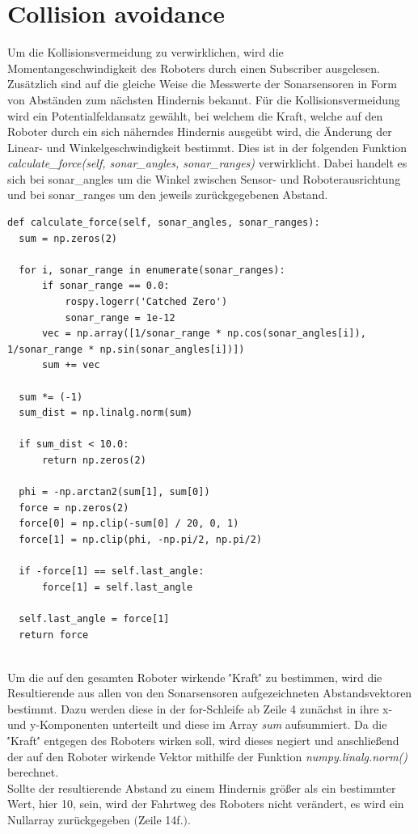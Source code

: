 \documentclass[12pt, a4paper]{report}
\begin{document}
\section{Collision avoidance}
Um die Kollisionsvermeidung zu verwirklichen, wird die Momentangeschwindigkeit des Roboters durch einen Subscriber ausgelesen. Zusätzlich sind auf die gleiche Weise die Messwerte der Sonarsensoren in Form von Abständen zum nächsten Hindernis bekannt.
Für die Kollisionsvermeidung wird ein Potentialfeldansatz gewählt, bei welchem die Kraft, welche auf den Roboter durch ein sich näherndes Hindernis ausgeübt wird, die Änderung der Linear- und Winkelgeschwindigkeit bestimmt. Dies ist in der folgenden Funktion \textit{calculate\_force(self, sonar\_angles, sonar\_ranges)} verwirklicht. Dabei handelt es sich bei sonar\_angles um die Winkel zwischen Sensor- und Roboterausrichtung und bei sonar\_ranges um den jeweils zurückgegebenen Abstand.
\begin{lstlisting}
def calculate_force(self, sonar_angles, sonar_ranges):
  sum = np.zeros(2)

  for i, sonar_range in enumerate(sonar_ranges):
      if sonar_range == 0.0:
          rospy.logerr('Catched Zero')
          sonar_range = 1e-12
      vec = np.array([1/sonar_range * np.cos(sonar_angles[i]), 1/sonar_range * np.sin(sonar_angles[i])])
      sum += vec
          
  sum *= (-1)
  sum_dist = np.linalg.norm(sum)
       
  if sum_dist < 10.0:
      return np.zeros(2)

  phi = -np.arctan2(sum[1], sum[0])
  force = np.zeros(2)
  force[0] = np.clip(-sum[0] / 20, 0, 1)
  force[1] = np.clip(phi, -np.pi/2, np.pi/2)

  if -force[1] == self.last_angle:
      force[1] = self.last_angle

  self.last_angle = force[1]
  return force
  
\end{lstlisting}
Um die auf den gesamten Roboter wirkende \''Kraft\'' zu bestimmen, wird die Resultierende aus allen von den Sonarsensoren aufgezeichneten Abstandsvektoren bestimmt. Dazu werden diese in der for-Schleife ab Zeile 4 zunächst in ihre x- und y-Komponenten unterteilt und diese im Array \textit{sum} aufsummiert. Da die \''Kraft\'' entgegen des Roboters wirken soll, wird dieses negiert und anschließend der auf den Roboter wirkende Vektor mithilfe der Funktion \textit{numpy.linalg.norm()} berechnet.\\
Sollte der resultierende Abstand zu einem Hindernis größer als ein bestimmter Wert, hier 10, sein, wird der Fahrtweg des Roboters nicht verändert, es wird ein Nullarray zurückgegeben $($Zeile 14f.$)$.\\
\end{document}
